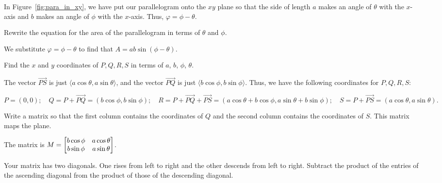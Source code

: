 \documentclass[../gatm_answers.tex]{subfiles}
\begin{document}
\begin{outer_problem}
\item In Figure~\ref{fig:para_in_xy}, we have put our parallelogram onto the $xy$ plane so that the side of length $a$ makes an angle of $\theta$ with the $x$-axis and $b$ makes an angle of $\phi$ with the $x$-axis. Thus, $\varphi=\phi-\theta$.
\end{outer_problem}

\begin{inner_problem}[start=1]
\item Rewrite the equation for the area of the parallelogram in terms of $\theta$ and $\phi$.
\end{inner_problem}

We substitute $\varphi = \phi - \theta$ to find that $A = ab\sin(\phi - \theta)$.

\begin{inner_problem}
\item Find the $x$ and $y$ coordinates of $P,Q,R,S$ in terms of $a$, $b$, $\phi$, $\theta$.
\end{inner_problem}

The vector $\overrightarrow{PS}$ is just $\langle a\cos \theta, a\sin\theta \rangle$, and the vector $\overrightarrow{PQ}$ is just $\langle b\cos\phi, b\sin\phi \rangle$. Thus, we have the following coordinates for $P,Q,R,S$:

$$P = (0,0);\quad Q = P+\overrightarrow{PQ} = (b\cos\phi, b\sin\phi);\quad R = P+\overrightarrow{PQ}+\overrightarrow{PS} = (a\cos\theta + b\cos\phi, a\sin\theta + b\sin\phi);\quad S = P+\overrightarrow{PS} = (a\cos\theta, a\sin\theta).$$

\begin{inner_problem}
\item Write a matrix so that the first column contains the coordinates of $Q$ and the second column contains the coordinates of $S$. This matrix maps the plane.
\end{inner_problem}

The matrix is $M=\begin{bmatrix} b\cos\phi & a\cos\theta \\ b\sin\phi & a\sin\theta \end{bmatrix}$.

\begin{inner_problem}
\item Your matrix has two diagonals. One rises from left to right and the other descends from left to right. Subtract the product of the entries of the ascending diagonal from the product of those of the descending diagonal.
\end{inner_problem}
\end{document}
